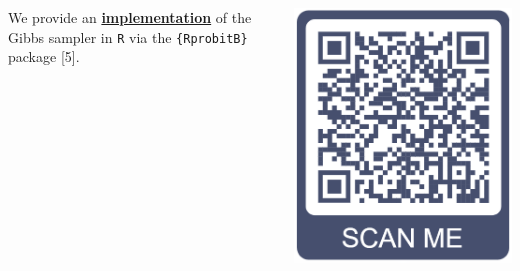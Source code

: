 \documentclass[25pt, a0paper, portrait]{tikzposter}
\renewcommand{\emph}[1]{
  \underline{\textcolor{Oeko}{\Large{\textbf{#1}}}}
}
\begin{document}
\begin{columns}
{\begin{minipage}{0.2\linewidth}
\end{minipage}
\begin{minipage}{0.6\linewidth}
\Large
We provide an \emph{implementation} of the Gibbs sampler in \texttt{R} via the \texttt{\{RprobitB\}} package [5].
\end{minipage}
\hspace{2ex}
\begin{minipage}{0.15\linewidth}
\includegraphics[scale = 0.6]{poster/qr_code.png}
\end{minipage}
\vspace{-3ex}
}


\end{columns}
\end{document}
